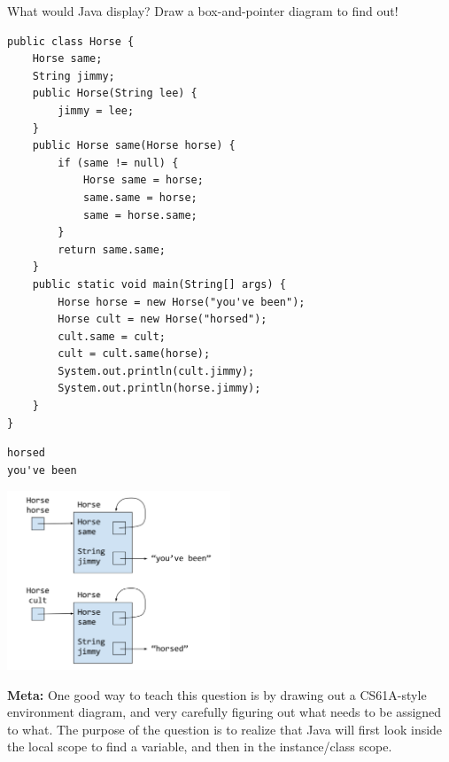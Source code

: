 \question What would Java display? Draw a box-and-pointer diagram to find out!
\begin{lstlisting}
public class Horse {
    Horse same;
    String jimmy;
    public Horse(String lee) {
        jimmy = lee;
    }
    public Horse same(Horse horse) {
        if (same != null) {
            Horse same = horse;
            same.same = horse;
            same = horse.same;
        }
        return same.same;
    }
    public static void main(String[] args) {
        Horse horse = new Horse("you've been");
        Horse cult = new Horse("horsed");
        cult.same = cult;
        cult = cult.same(horse);
        System.out.println(cult.jimmy);
        System.out.println(horse.jimmy);
    }
}
\end{lstlisting}

\begin{solution}[1.5in]
\begin{verbatim}
horsed
you've been
\end{verbatim}

\includegraphics[width=0.5\textwidth]{samehorse}

\textbf{Meta:} One good way to teach this question is by drawing out a CS61A-style environment diagram, and very carefully figuring out what needs to be assigned to what. The purpose of the question is to realize that Java will first look inside the local scope to find a variable, and then in the instance/class scope. 
\end{solution}
